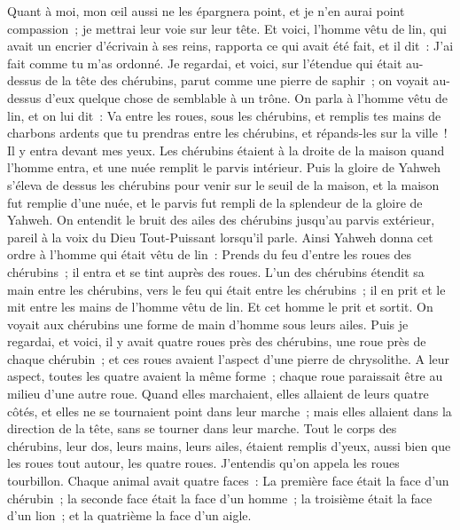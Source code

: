 \begin{multicols}{2}
Quant à moi, mon œil aussi ne les épargnera point, et je n'en aurai point compassion~; je mettrai leur voie sur leur tête.
Et voici, l'homme vêtu de lin, qui avait un encrier d'écrivain à ses reins, rapporta ce qui avait été fait, et il dit~: J'ai fait comme tu m'as ordonné.
\VerseOne{}Je regardai, et voici, sur l'étendue qui était au-dessus de la tête des chérubins, parut comme une pierre de saphir~; on voyait au-dessus d'eux quelque chose de semblable à un trône.
On parla à l'homme vêtu de lin, et on lui dit~: Va entre les roues, sous les chérubins, et remplis tes mains de charbons ardents que tu prendras entre les chérubins, et répands-les sur la ville~! Il y entra devant mes yeux.
Les chérubins étaient à la droite de la maison quand l'homme entra, et une nuée remplit le parvis intérieur.
Puis la gloire de Yahweh s'éleva de dessus les chérubins pour venir sur le seuil de la maison, et la maison fut remplie d'une nuée, et le parvis fut rempli de la splendeur de la gloire de Yahweh.
On entendit le bruit des ailes des chérubins jusqu'au parvis extérieur, pareil à la voix du Dieu Tout-Puissant lorsqu'il parle.
Ainsi Yahweh donna cet ordre à l'homme qui était vêtu de lin~: Prends du feu d'entre les roues des chérubins~; il entra et se tint auprès des roues.
L'un des chérubins étendit sa main entre les chérubins, vers le feu qui était entre les chérubins~; il en prit et le mit entre les mains de l'homme vêtu de lin. Et cet homme le prit et sortit.
On voyait aux chérubins une forme de main d'homme sous leurs ailes.
Puis je regardai, et voici, il y avait quatre roues près des chérubins, une roue près de chaque chérubin~; et ces roues avaient l'aspect d'une pierre de chrysolithe.
A leur aspect, toutes les quatre avaient la même forme~; chaque roue paraissait être au milieu d'une autre roue.
Quand elles marchaient, elles allaient de leurs quatre côtés, et elles ne se tournaient point dans leur marche~; mais elles allaient dans la direction de la tête, sans se tourner dans leur marche.
Tout le corps des chérubins, leur dos, leurs mains, leurs ailes, étaient remplis d'yeux, aussi bien que les roues tout autour, les quatre roues.
J'entendis qu'on appela les roues tourbillon.
Chaque animal avait quatre faces~: La première face était la face d'un chérubin~; la seconde face était la face d'un homme~; la troisième était la face d'un lion~; et la quatrième la face d'un aigle.

\end{multicols}
